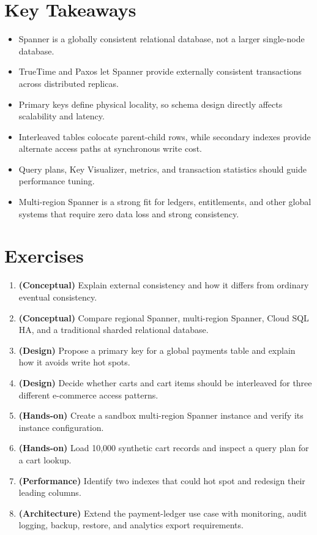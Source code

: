 \section*{Key Takeaways}
\begin{itemize}
    \item Spanner is a globally consistent relational database, not a larger single-node database.
    \item TrueTime and Paxos let Spanner provide externally consistent transactions across distributed replicas.
    \item Primary keys define physical locality, so schema design directly affects scalability and latency.
    \item Interleaved tables colocate parent-child rows, while secondary indexes provide alternate access paths at synchronous write cost.
    \item Query plans, Key Visualizer, metrics, and transaction statistics should guide performance tuning.
    \item Multi-region Spanner is a strong fit for ledgers, entitlements, and other global systems that require zero data loss and strong consistency.
\end{itemize}

\section{Exercises}
\begin{enumerate}
    \item \textbf{(Conceptual)} Explain external consistency and how it differs from ordinary eventual consistency.
    \item \textbf{(Conceptual)} Compare regional Spanner, multi-region Spanner, Cloud SQL HA, and a traditional sharded relational database.
    \item \textbf{(Design)} Propose a primary key for a global payments table and explain how it avoids write hot spots.
    \item \textbf{(Design)} Decide whether carts and cart items should be interleaved for three different e-commerce access patterns.
    \item \textbf{(Hands-on)} Create a sandbox multi-region Spanner instance and verify its instance configuration.
    \item \textbf{(Hands-on)} Load 10,000 synthetic cart records and inspect a query plan for a cart lookup.
    \item \textbf{(Performance)} Identify two indexes that could hot spot and redesign their leading columns.
    \item \textbf{(Architecture)} Extend the payment-ledger use case with monitoring, audit logging, backup, restore, and analytics export requirements.
\end{enumerate}

